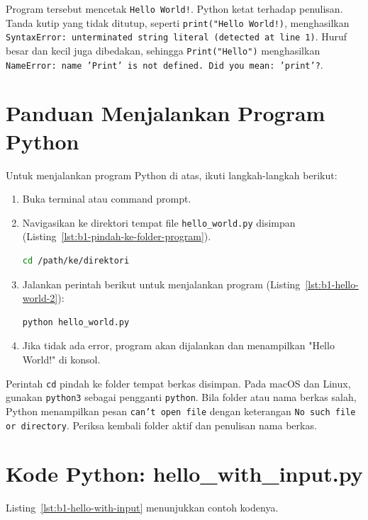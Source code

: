 Program tersebut mencetak \texttt{Hello World!}. Python ketat terhadap penulisan. Tanda kutip yang tidak ditutup, seperti \texttt{print("Hello World!)}, menghasilkan \texttt{SyntaxError: unterminated string literal (detected at line 1)}. Huruf besar dan kecil juga dibedakan, sehingga \texttt{Print("Hello")} menghasilkan \texttt{NameError: name 'Print' is not defined. Did you mean: 'print'?}.

\section{Panduan Menjalankan Program Python}

Untuk menjalankan program Python di atas, ikuti langkah-langkah berikut:

\begin{enumerate}
	\item Buka terminal atau command prompt.
	\item Navigasikan ke direktori tempat file \texttt{hello\_world.py} disimpan (Listing~\ref{lst:b1-pindah-ke-folder-program}).
\begin{lstlisting}[language=bash, caption={Pindah ke folder program}, label={lst:b1-pindah-ke-folder-program}]
cd /path/ke/direktori
\end{lstlisting}
	\item Jalankan perintah berikut untuk menjalankan program (Listing~\ref{lst:b1-hello-world-2}):
\begin{lstlisting}[language=bash, caption={Menjalankan hello_world.py}, label={lst:b1-hello-world-2}]
python hello_world.py
\end{lstlisting}
	\item Jika tidak ada error, program akan dijalankan dan menampilkan "Hello World!" di konsol.
\end{enumerate}


Perintah \texttt{cd} pindah ke folder tempat berkas disimpan. Pada macOS dan Linux, gunakan \texttt{python3} sebagai pengganti \texttt{python}. Bila folder atau nama berkas salah, Python menampilkan pesan \texttt{can't open file} dengan keterangan \texttt{No such file or directory}. Periksa kembali folder aktif dan penulisan nama berkas.

\section{Kode Python: hello_with_input.py}

Listing~\ref{lst:b1-hello-with-input} menunjukkan contoh kodenya.

